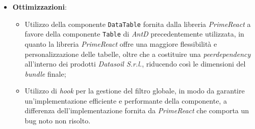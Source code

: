 \begin{itemize}
      \item \textbf{Ottimizzazioni}:
            \begin{itemize}
                  \item Utilizzo della componente \texttt{DataTable} fornita dalla libreria \textit{PrimeReact} a favore della componente \texttt{Table} di \textit{AntD} precedentemente utilizzata,
                        in quanto la libreria \textit{PrimeReact} offre una maggiore flessibilità e personalizzazione delle tabelle, oltre che a costituire una \textit{peerdependency} all'interno dei
                        prodotti \textit{Datasoil S.r.l.}, riducendo così le dimensioni del \textit{bundle} finale;
                  \item Utilizzo di \textit{hook} per la gestione del filtro globale, in modo da garantire un'implementazione efficiente e performante della componente, a differenza dell'implementazione
                        fornita da \textit{PrimeReact} che comporta un bug noto non risolto. \label{item:hookTable}
            \end{itemize}
\end{itemize}

